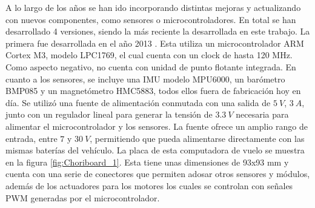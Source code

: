 



A lo largo de los años se han ido incorporando distintas mejoras y actualizando con nuevos componentes, como sensores o microcontroladores. En total se han desarrollado 4 versiones, siendo la más reciente la desarrollada en este trabajo. La primera fue desarrollada en el año 2013 \cite{Pose2014}. Esta utiliza un microcontrolador ARM Cortex M3, modelo LPC1769, el cual cuenta con un clock de hasta 120 MHz. Como aspecto negativo, no cuenta con unidad de punto flotante integrada. En cuanto a los sensores, se incluye una IMU modelo MPU6000, un barómetro BMP085 y un magnetómetro HMC5883, todos ellos fuera de fabricación hoy en día. Se utilizó una fuente de alimentación conmutada con una salida de $5 \ V$, $3 \ A$, junto con un regulador lineal para generar la tensión de $3.3 \ V$ necesaria para alimentar el microcontrolador y los sensores. La fuente ofrece un amplio rango de entrada, entre $7$ y $30 \ V$, permitiendo que pueda alimentarse directamente con las mismas baterías del vehículo. La placa de esta computadora de vuelo se muestra en la figura \ref{fig:Choriboard_1}. Esta tiene unas dimensiones de 93x93 mm y cuenta con una serie de conectores que permiten adosar otros sensores y módulos, además de los actuadores para los motores los cuales se controlan con señales PWM generadas por el microcontrolador.


